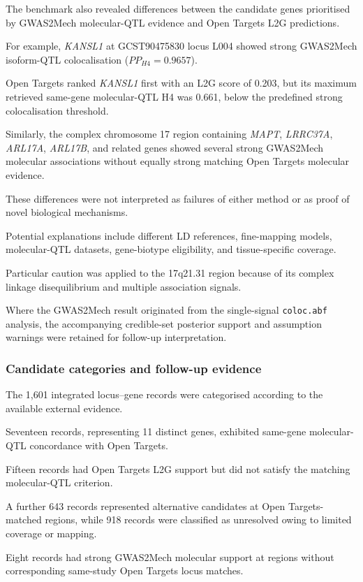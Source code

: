 \documentclass[11pt,a4paper]{article}
\begin{document}
The benchmark also revealed differences
between the candidate genes prioritised
by GWAS2Mech molecular-QTL evidence
and Open Targets L2G predictions.

For example, \textit{KANSL1}
at GCST90475830 locus L004
showed strong GWAS2Mech
isoform-QTL colocalisation
($PP_{H4}=0.9657$).

Open Targets ranked \textit{KANSL1}
first with an L2G score of 0.203,
but its maximum retrieved same-gene
molecular-QTL H4 was 0.661,
below the predefined strong
colocalisation threshold.

Similarly, the complex chromosome 17
region containing \textit{MAPT},
\textit{LRRC37A}, \textit{ARL17A},
\textit{ARL17B}, and related genes
showed several strong GWAS2Mech
molecular associations without
equally strong matching Open Targets
molecular evidence.

These differences were not interpreted
as failures of either method or as
proof of novel biological mechanisms.

Potential explanations include
different LD references, fine-mapping
models, molecular-QTL datasets,
gene-biotype eligibility,
and tissue-specific coverage.

Particular caution was applied to
the 17q21.31 region because of its
complex linkage disequilibrium
and multiple association signals.

Where the GWAS2Mech result originated
from the single-signal
\texttt{coloc.abf} analysis,
the accompanying credible-set
posterior support and assumption
warnings were retained for
follow-up interpretation.


\subsubsection{Candidate categories and follow-up evidence}

The 1,601 integrated locus--gene
records were categorised according
to the available external evidence.

Seventeen records, representing
11 distinct genes, exhibited
same-gene molecular-QTL concordance
with Open Targets.

Fifteen records had Open Targets
L2G support but did not satisfy
the matching molecular-QTL criterion.

A further 643 records represented
alternative candidates at
Open Targets-matched regions,
while 918 records were classified
as unresolved owing to limited
coverage or mapping.

Eight records had strong GWAS2Mech
molecular support at regions
without corresponding same-study
Open Targets locus matches.
\end{document}
